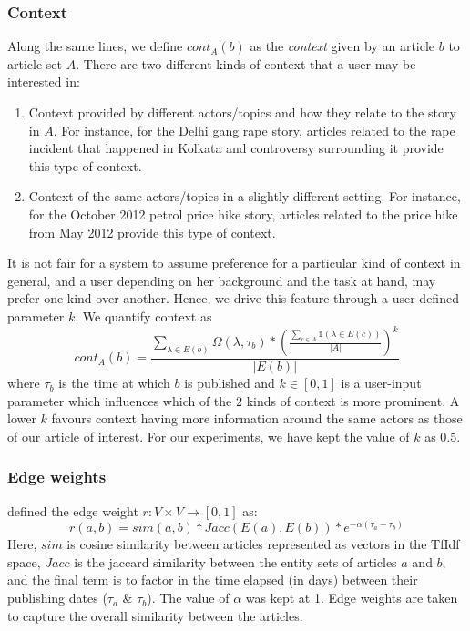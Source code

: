 \subsubsection*{Context}
Along the same lines, we define $cont_{A}(b)$ as the \emph{context} given by an article $b$ to article set $A$. There are two different kinds of context that a user may be interested in: 
\begin{enumerate}
\item Context provided by different actors/topics and how they relate to the story in $A$. For instance, for the Delhi gang rape story, articles related to the rape incident that happened in Kolkata and controversy surrounding it provide this type of context. 
\item Context of the same actors/topics in a slightly different setting. For instance, for the October 2012 petrol price hike story, articles related to the price hike from May 2012 provide this type of context. 
\end{enumerate}
It is not fair for a system to assume preference for a particular kind of context in general, and a user depending on her background and the task at hand, may prefer one kind over another. Hence, we drive this feature through a user-defined parameter $k$. 
We quantify context as
\begin{equation}
cont_{A}(b) = \frac{\sum_{\lambda \in E(b)}{\Omega(\lambda, \tau_b)*(\frac{\sum_{c \in A}\mathbb{1}(\lambda \in E(c))}{|A|})^{k}}}{|E(b)|}
\end{equation}
where $\tau_b$ is the time at which $b$ is published and $k \in [0, 1]$ is a user-input parameter which influences which of the 2 kinds of context is more prominent. A lower $k$ favours context having more information
around the same actors as those of our article of interest. For our experiments, we have kept the value of $k$ as 0.5.

\subsubsection*{Edge weights}
\label{subsec:edge_weight}
\cite{choudhary@ecir2008} defined the edge weight $r:V \times V \rightarrow [0,1]$ as:
\begin{equation}
r(a, b) = sim(a,b) * Jacc(E(a), E(b)) * e^{-\alpha(\tau_a - \tau_b)}
\end{equation}
Here, $sim$ is cosine similarity between articles represented as vectors in the TfIdf space, $Jacc$ is the jaccard similarity between
the entity sets of articles $a$ and $b$, and the final term is to factor in the time elapsed (in days) between their publishing dates ($\tau_a$ \& $\tau_b$).
The value of $\alpha$ was kept at 1. Edge weights are taken to capture the overall similarity between the articles.

